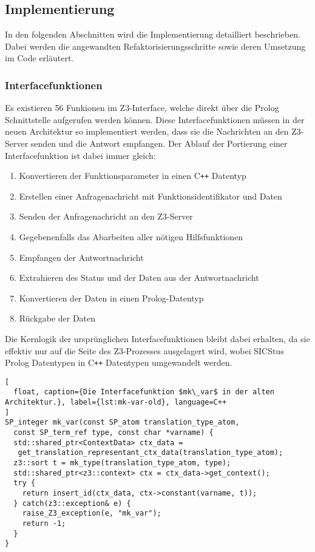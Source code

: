 \subsection{Implementierung}

In den folgenden Abschnitten wird die Implementierung detailliert beschrieben.
Dabei werden die angewandten Refaktorisierungsschritte sowie deren Umsetzung im Code erläutert.

\subsubsection{Interfacefunktionen}

Es existieren 56 Funkionen im Z3-Interface, welche direkt über die Prolog Schnittstelle aufgerufen werden können.
Diese Interfacefunktionen müssen in der neuen Architektur so implementiert werden, dass sie die Nachrichten an den Z3-Server senden und die Antwort empfangen.
Der Ablauf der Portierung einer Interfacefunktion ist dabei immer gleich:

\begin{enumerate}
  \item Konvertieren der Funktionsparameter in einen C\texttt{++} Datentyp
  \item Erstellen einer Anfragenachricht mit Funktionsidentifikator und Daten
  \item Senden der Anfragenachricht an den Z3-Server
  \item Gegebenenfalls das Abarbeiten aller nötigen Hilfsfunktionen
  \item Empfangen der Antwortnachricht
  \item Extrahieren des Status und der Daten aus der Antwortnachricht
  \item Konvertieren der Daten in einen Prolog-Datentyp
  \item Rückgabe der Daten
\end{enumerate}

Die Kernlogik der ursprünglichen Interfacefunktionen bleibt dabei erhalten, da sie effektiv nur auf die Seite des Z3-Prozesses ausgelagert wird,
wobei SICStus Prolog Datentypen in C\texttt{++} Datentypen umgewandelt werden.

\begin{lstlisting}[
  float, caption={Die Interfacefunktion $mk\_var$ in der alten Architektur.}, label={lst:mk-var-old}, language=C++
]
SP_integer mk_var(const SP_atom translation_type_atom,
  const SP_term_ref type, const char *varname) {
  std::shared_ptr<ContextData> ctx_data = 
   get_translation_representant_ctx_data(translation_type_atom);
  z3::sort t = mk_type(translation_type_atom, type);
  std::shared_ptr<z3::context> ctx = ctx_data->get_context();
  try {
    return insert_id(ctx_data, ctx->constant(varname, t));
  } catch(z3::exception& e) {
    raise_Z3_exception(e, "mk_var");
    return -1;
  }
}
\end{lstlisting}

